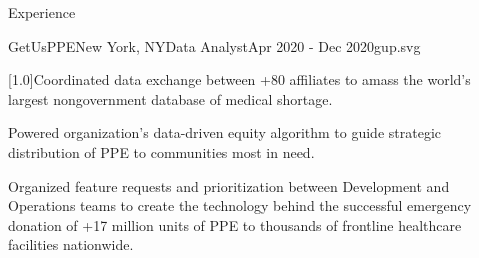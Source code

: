 \documentclass{ForrestBickerResume}
\begin{document}
\begin{rSection}{Experience}
    \begin{rSubsection}{GetUsPPE}{New York, NY}{Data Analyst}{Apr 2020 - Dec 2020}{gup.svg}
        \item \scalebox{.98}[1.0]{Coordinated data exchange between +80 affiliates to amass the world's largest nongovernment database of medical shortage.}
        \item Powered organization's data-driven equity algorithm to guide strategic distribution of PPE to communities most in need.\vspace{2pt}
        \\
        \item Organized feature requests and prioritization between Development and Operations teams to create the technology behind the successful emergency donation of +17 million units of PPE to thousands of frontline healthcare facilities nationwide.
    \end{rSubsection}

    \end{rSection}
\end{document}
